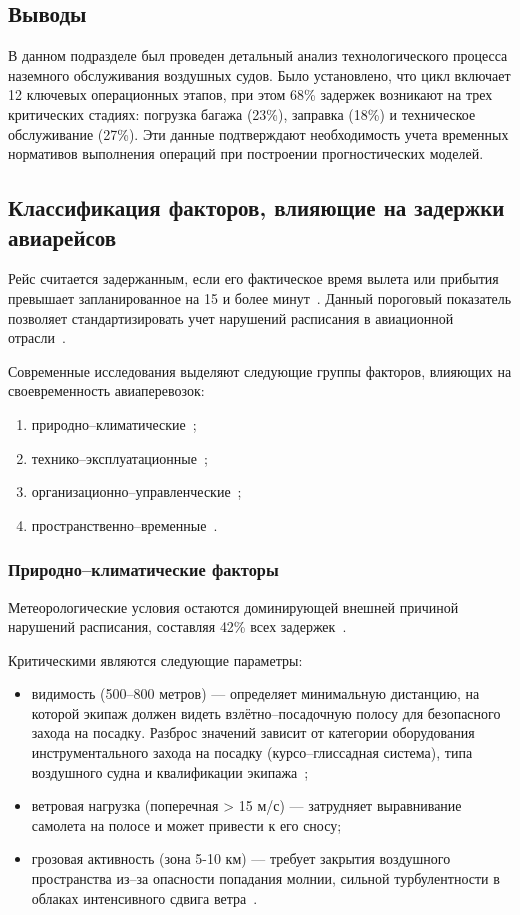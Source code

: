 \subsection*{Выводы}

В данном подразделе был проведен детальный анализ технологического процесса наземного обслуживания воздушных судов.
Было установлено, что цикл включает 12 ключевых операционных этапов, при этом 68\% задержек возникают на трех критических стадиях: погрузка багажа (23\%), заправка (18\%) и техническое обслуживание (27\%).
Эти данные подтверждают необходимость учета временных нормативов выполнения операций при построении прогностических моделей.

\subsection{Классификация факторов, влияющие на задержки авиарейсов}

Рейс считается задержанным, если его фактическое время вылета или прибытия превышает запланированное на 15 и более минут~\cite{otplane}.
Данный пороговый показатель позволяет стандартизировать учет нарушений расписания в авиационной отрасли~\cite{icao-annex11}.

Современные исследования выделяют следующие группы факторов, влияющих на своевременность авиаперевозок:
\begin{enumerate}[label=\arabic*)]
    \item природно--климатические~\cite{nasa-weather};
    \item технико--эксплуатационные~\cite{faa-ntsb};
    \item организационно--управленческие~\cite{iata-ground-ops};
    \item пространственно--временные~\cite{spatial-delays-2022}.
\end{enumerate}

\subsubsection*{Природно--климатические факторы}
Метеорологические условия остаются доминирующей внешней причиной нарушений расписания, составляя 42\% всех задержек~\cite{eurocontrol-2022}.

Критическими являются следующие параметры:
\begin{itemize}[label=---]
    \item видимость (500--800 метров) --- определяет минимальную дистанцию, на которой экипаж должен видеть взлётно--посадочную полосу для безопасного захода на посадку.
    Разброс значений зависит от категории оборудования инструментального захода на посадку (курсо--глиссадная система), типа воздушного судна и квалификации экипажа~\cite{icao-annex3};

    \item ветровая нагрузка (поперечная > 15 м/с) --- затрудняет выравнивание самолета на полосе и может привести к его сносу;
    \item грозовая активность (зона 5-10 км) --- требует закрытия воздушного пространства из--за опасности попадания молнии, сильной турбулентности в облаках интенсивного сдвига ветра~\cite{icao-annex3}.
\end{itemize}

